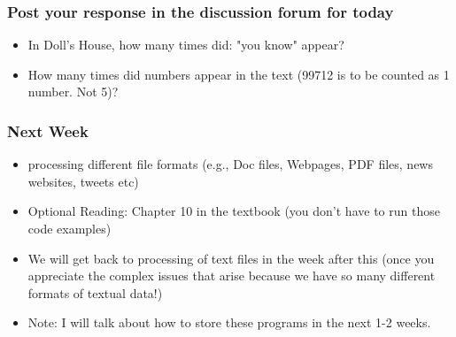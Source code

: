 \documentclass{beamer}
\begin{document}
\begin{frame}
\frametitle{Post your response in the discussion forum for today}
\begin{itemize}
\item In Doll's House, how many times did: "you know" appear? 
\item How many times did numbers  appear in the text (99712 is to be counted as 1 number. Not 5)?
\end{itemize}
\end{frame}

\begin{frame}
\frametitle{Next Week}
\begin{itemize}
\item processing different file formats (e.g., Doc files, Webpages, PDF files, news websites, tweets etc)
\item Optional Reading: Chapter 10 in the textbook (you don't have to run those code examples)
\item We will get back to processing of text files in the week after this (once you appreciate the complex issues that arise because we have so many different formats of textual data!)
\item Note: I will talk about how to store these programs in the next 1-2 weeks. 
\end{itemize}
\end{frame}
\end{document}
